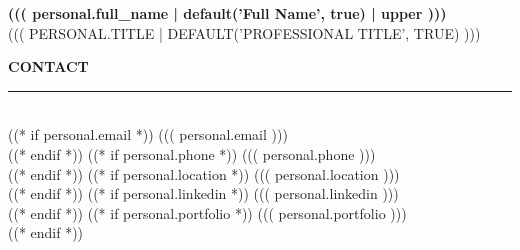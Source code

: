 \documentclass[11pt,a4paper]{article}
\begin{document}
\noindent
{}

\noindent
\begin{minipage}[t]{0.34\textwidth}
\color{white}
\vspace{9mm}
\hspace{7mm}
\begin{minipage}[t]{0.78\textwidth}

{\fontsize{22}{26}\selectfont\bfseries ((( personal.full_name | default('Full Name', true) | upper )))}\\[6pt]
{\fontsize{8}{10}\selectfont\color{accent}\MakeUppercase{((( personal.title | default('Professional Title', true) )))}}

\vspace{8mm}

{\fontsize{9}{11}\selectfont\bfseries\MakeUppercase{Contact}}\\[2pt]
{\color{white!25}\rule{\linewidth}{0.3pt}}\\[8pt]
((* if personal.email *))
{\small\faEnvelope\hspace{8pt}((( personal.email )))}\\[7pt]
((* endif *))
((* if personal.phone *))
{\small\faPhone\hspace{8pt}((( personal.phone )))}\\[7pt]
((* endif *))
((* if personal.location *))
{\small\faMapMarker*\hspace{8pt}((( personal.location )))}\\[7pt]
((* endif *))
((* if personal.linkedin *))
{\small\faLinkedin\hspace{8pt}((( personal.linkedin )))}\\
((* endif *))
((* if personal.portfolio *))
{\small\faGlobe\hspace{8pt}((( personal.portfolio )))}\\
((* endif *))

\vspace{8pt}


\end{minipage}
\end{minipage}
\end{document}
